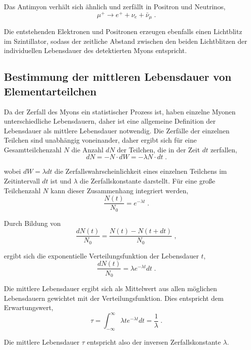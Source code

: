 Das Antimyon verhält sich ähnlich und zerfällt in Positron und Neutrinos, $$\mu^+ \rightarrow e^+ + \nu_e + \bar{\nu}_\mu\; .$$

Die entstehenden Elektronen und Positronen erzeugen ebenfalls einen Lichtblitz im Szintillator, sodass der zeitliche Abstand zwischen den beiden Lichtblitzen der individuellen Lebensdauer des detektierten Myons entspricht.

\subsection{Bestimmung der mittleren Lebensdauer von Elementarteilchen}

Da der Zerfall des Myons ein statistischer Prozess ist, haben einzelne Myonen unterschiedliche Lebensdauern, daher ist eine allgemeine Definition der Lebensdauer als mittlere Lebensdauer notwendig. Die Zerfälle der einzelnen Teilchen sind unabhängig voneinander, daher ergibt sich für eine Gesamtteilchenzahl $N$ die Anzahl $dN$ der Teilchen, die in der Zeit $dt$ zerfallen, $$dN = -N \cdot dW = -\lambda N \cdot dt\; . $$

wobei $dW = \lambda dt$ die Zerfallswahrscheinlichkeit eines einzelnen Teilchens im Zeitintervall $dt$ ist und $\lambda$ die Zerfallskonstante darstellt. Für eine große Teilchenzahl $N$ kann dieser Zusammenhang integriert werden, $$\frac{N(t)}{N_0} = e^{-\lambda t}\; . $$

Durch Bildung von $$\frac{dN(t)}{N_0} = \frac{N(t) - N(t+dt)}{N_0}\;  ,  $$

ergibt sich die exponentielle Verteilungsfunktion der Lebensdauer $t$, $$\frac{dN(t)}{N_0} = \lambda e^{-\lambda t} dt\; .$$

Die mittlere Lebensdauer ergibt sich als Mittelwert aus allen möglichen Lebensdauern gewichtet mit der Verteilungsfunktion. Dies entspricht dem Erwartungswert, $$\tau = \int_{-\infty}^{\infty} \lambda t e^{-\lambda t} dt = \frac{1}{\lambda}\; . $$

Die mittlere Lebensdauer $\tau$ entspricht also der inversen Zerfallskonstante $\lambda$.

